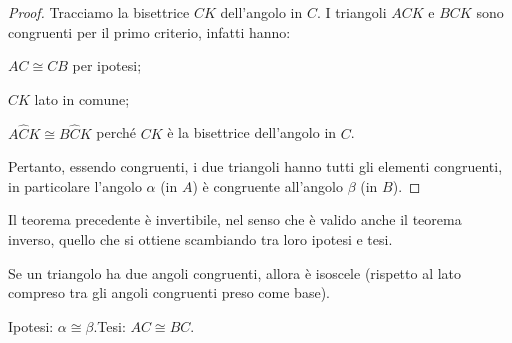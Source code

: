 \begin{proof}
Tracciamo la bisettrice \(CK\) dell'angolo in \(C\).
I triangoli \(ACK\) e \(BCK\) sono congruenti per il primo criterio, 
infatti hanno:
\begin{itemize*}
\item \(AC\cong CB\) per ipotesi;
\item \(CK\) lato in comune;
\item \(A\widehat{C}K\cong B\widehat{C}K\) perché \(CK\) è la bisettrice 
dell'angolo in \(C\).
\end{itemize*}
Pertanto, essendo congruenti, i due triangoli hanno tutti gli 
elementi congruenti, in particolare l'angolo \(\alpha\) (in \(A\)) è 
congruente all'angolo \(\beta\) (in \(B\)).
\end{proof}

Il teorema precedente è invertibile, nel senso che è valido anche il 
teorema inverso, quello che si ottiene scambiando tra loro ipotesi e 
tesi.

\begin{teorema}
Se un triangolo ha due angoli congruenti, allora è isoscele (rispetto 
al lato compreso tra gli angoli congruenti preso come base).
\end{teorema}


\begin{inaccessibleblock}
 \begin{figure}[htb]
\centering
\end{figure}
\end{inaccessibleblock}

\noindent Ipotesi: \(\alpha\cong \beta\).\tab Tesi: \(AC\cong BC\).

